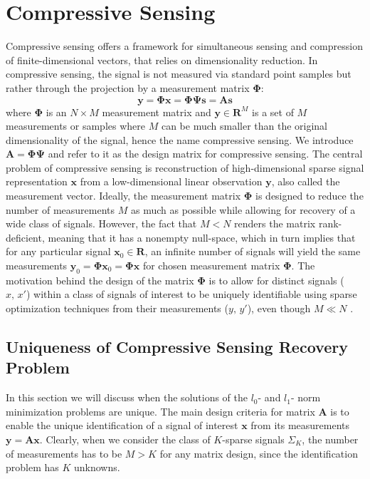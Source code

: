 \documentclass[journal]{IEEEtran}
\begin{document}
\section{Compressive Sensing}
Compressive sensing offers a framework for simultaneous sensing and compression of finite-dimensional vectors, that relies on dimensionality reduction. In compressive sensing, the signal is not measured via standard point samples but rather through the projection by a measurement matrix $\boldsymbol{\Phi}$:
%
\begin{equation}
	\boldsymbol{y}=\boldsymbol{\Phi} \boldsymbol{x}=\boldsymbol{\Phi} \boldsymbol{\Psi} \boldsymbol{s}=\boldsymbol{A} \boldsymbol{s}
\end{equation}
%
where $\boldsymbol{\Phi}$ is an $N\times M$ measurement matrix and $\boldsymbol{y}\in\mathbf{R}^M$ is a set of $M$ measurements or samples where $M$ can be much smaller than the original dimensionality of the signal, hence the name compressive sensing. We introduce $\boldsymbol{A}=\boldsymbol{\Phi}\boldsymbol{\Psi}$ and refer to it as the design matrix for compressive sensing. The central problem of compressive sensing is reconstruction of high-dimensional sparse signal representation $\boldsymbol{x}$ from a low-dimensional linear observation $\boldsymbol{y}$, also called the measurement vector. Ideally, the measurement matrix $\boldsymbol{\Phi}$ is designed to reduce the number of measurements $M$ as much as possible while allowing for recovery of a wide class of signals. However, the fact that $M<N$ renders the matrix rank-deficient, meaning that it has a nonempty null-space, which in turn implies that for any particular signal $\boldsymbol{x}_0\in \mathbf{R}$, an infinite number of signals will yield the same measurements $\boldsymbol{y}_0=\boldsymbol{\Phi} \boldsymbol{x}_0 = \boldsymbol{\Phi} \boldsymbol{x}$ for chosen measurement matrix $\boldsymbol{\Phi}$. The motivation behind the design of the matrix $\boldsymbol{\Phi}$ is to allow for distinct signals ($x,\,x'$) within a class of signals of interest to be uniquely identifiable using sparse optimization techniques from their measurements ($y,\,y'$), even though $M\ll N$ \cite{Duarte2011}.

\subsection{Uniqueness of Compressive Sensing Recovery Problem}
In this section we will discuss when the solutions of the $l_0$- and $l_1$- norm minimization problems are unique. The main design criteria for matrix $\boldsymbol{A}$ is to enable the unique identification of a signal of interest $\boldsymbol{x}$ from its measurements $\boldsymbol{y}=\boldsymbol{A}\boldsymbol{x}$. Clearly, when we consider the class of $K$-sparse signals $\Sigma_K$, the number of measurements has to be $M>K$ for any matrix design, since the identification problem has $K$ unknowns.
\end{document}
